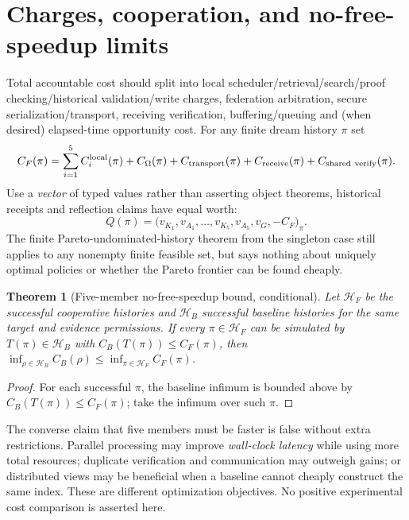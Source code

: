 \documentclass[11pt]{article}
\newtheorem{theorem}{Theorem}[section]
\begin{document}
\section{Charges, cooperation, and no-free-speedup limits}
Total accountable cost should split into local scheduler/retrieval/search/proof checking/historical validation/write charges, federation arbitration, secure serialization/transport, receiving verification, buffering/queuing and (when desired) elapsed-time opportunity cost. For any finite dream history $\pi$ set
\[ C_F(\pi)=\sum_{i=1}^5 C_i^{\rm local}(\pi)+C_{\Omega}(\pi)+C_{\rm transport}(\pi)+C_{\rm receive}(\pi)+C_{\rm shared\ verify}(\pi).\]
Use a \emph{vector} of typed values rather than asserting object theorems, historical receipts and reflection claims have equal worth:
\[ Q(\pi)=\big(v_{K_1},v_{A_1},\ldots,v_{K_5},v_{A_5},v_G,-C_F\big)_\pi.\]
The finite Pareto-undominated-history theorem from the singleton case still applies to any nonempty finite feasible set, but says nothing about uniquely optimal policies or whether the Pareto frontier can be found cheaply.
\begin{theorem}[Five-member no-free-speedup bound, conditional]
Let $\mathcal H_F$ be the successful cooperative histories and $\mathcal H_B$ successful baseline histories for the \emph{same} target and evidence permissions. If every $\pi\in\mathcal H_F$ can be simulated by $T(\pi)\in\mathcal H_B$ with $C_B(T(\pi))\le C_F(\pi)$, then $\inf_{\rho\in\mathcal H_B}C_B(\rho)\le \inf_{\pi\in\mathcal H_F}C_F(\pi)$.
\end{theorem}
\begin{proof}For each successful $\pi$, the baseline infimum is bounded above by $C_B(T(\pi))\le C_F(\pi)$; take the infimum over such $\pi$.\end{proof}
The converse claim that five members must be faster is false without extra restrictions. Parallel processing may improve \emph{wall-clock latency} while using more total resources; duplicate verification and communication may outweigh gains; or distributed views may be beneficial when a baseline cannot cheaply construct the same index. These are different optimization objectives. No positive experimental cost comparison is asserted here.
\end{document}
